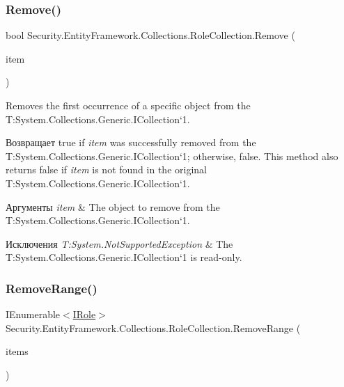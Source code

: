 \subsubsection{\texorpdfstring{Remove()}{Remove()}}
{\footnotesize\ttfamily bool Security.\+Entity\+Framework.\+Collections.\+Role\+Collection.\+Remove (\begin{DoxyParamCaption}\item[{\hyperlink{interface_security_1_1_interfaces_1_1_model_1_1_i_role}{I\+Role}}]{item }\end{DoxyParamCaption})}



Removes the first occurrence of a specific object from the T\+:\+System.\+Collections.\+Generic.\+I\+Collection`1. 

\begin{DoxyReturn}{Возвращает}
true if {\itshape item}  was successfully removed from the T\+:\+System.\+Collections.\+Generic.\+I\+Collection`1; otherwise, false. This method also returns false if {\itshape item}  is not found in the original T\+:\+System.\+Collections.\+Generic.\+I\+Collection`1. 
\end{DoxyReturn}

\begin{DoxyParams}{Аргументы}
{\em item} & The object to remove from the T\+:\+System.\+Collections.\+Generic.\+I\+Collection`1.\\
\hline
\end{DoxyParams}

\begin{DoxyExceptions}{Исключения}
{\em T\+:\+System.\+Not\+Supported\+Exception} & The T\+:\+System.\+Collections.\+Generic.\+I\+Collection`1 is read-\/only.\\
\hline
\end{DoxyExceptions}
\mbox{\label{class_security_1_1_entity_framework_1_1_collections_1_1_role_collection_a423ee7f63c7dce325e7d16af642fc7d6}} 
\subsubsection{\texorpdfstring{Remove\+Range()}{RemoveRange()}}
{\footnotesize\ttfamily I\+Enumerable$<$\hyperlink{interface_security_1_1_interfaces_1_1_model_1_1_i_role}{I\+Role}$>$ Security.\+Entity\+Framework.\+Collections.\+Role\+Collection.\+Remove\+Range (\begin{DoxyParamCaption}\item[{I\+Enumerable$<$ \hyperlink{interface_security_1_1_interfaces_1_1_model_1_1_i_role}{I\+Role} $>$}]{items }\end{DoxyParamCaption})}



